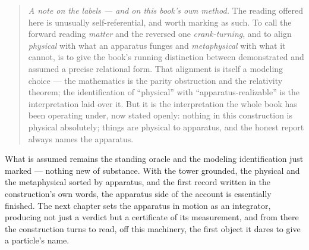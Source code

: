 \begin{quote}
\emph{A note on the labels --- and on this book's own method.} The reading offered here is unusually
self-referential, and worth marking as such. To call the forward reading \emph{matter} and the reversed
one \emph{crank-turning}, and to align \emph{physical} with what an apparatus funges and
\emph{metaphysical} with what it cannot, is to give the book's running distinction between demonstrated
and assumed a precise relational form. That alignment is itself a modeling choice --- the mathematics is
the parity obstruction and the relativity theorem; the identification of ``physical'' with
``apparatus-realizable'' is the interpretation laid over it. But it is the interpretation the whole book
has been operating under, now stated openly: nothing in this construction is physical absolutely;
things are physical to apparatus, and the honest report always names the apparatus.
\end{quote}

What is assumed remains the standing oracle and the modeling identification just marked --- nothing new
of substance. With the tower grounded, the physical and the metaphysical sorted by apparatus, and the
first record written in the construction's own words, the apparatus side of the account is essentially
finished. The next chapter sets the apparatus in motion as an integrator, producing not just a verdict
but a certificate of its measurement, and from there the construction turns to read, off this machinery,
the first object it dares to give a particle's name.

